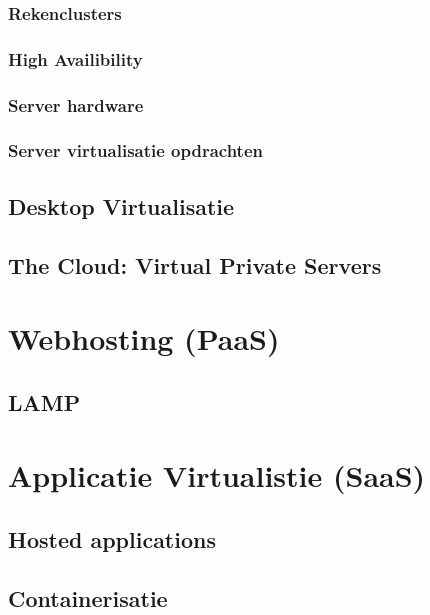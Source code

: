 \documentclass[a4paper,12pt,twoside,openright,titlepage]{book}
\begin{document}
\subsection{Rekenclusters}

\subsection{High Availibility}

\subsection{Server hardware}

\subsection{Server virtualisatie opdrachten}

\section{Desktop Virtualisatie}
\section{The Cloud: Virtual Private Servers}

\chapter{Webhosting (PaaS)}
\section{LAMP}

\chapter{Applicatie Virtualistie (SaaS)}

\section{Hosted applications}
\section{Containerisatie}
\end{document}
